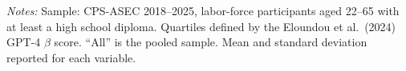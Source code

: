 \documentclass[11pt]{article}
\begin{document}
\begin{landscape}
\begin{table}[H]
\begin{center}
\caption{Summary statistics by AI exposure quartile.}
\label{tab:summary}

\end{center}
\smallskip
\noindent\footnotesize\textit{Notes:} Sample: CPS-ASEC 2018--2025, labor-force participants aged 22--65 with at least a high school diploma. Quartiles defined by the Eloundou et al.\ (2024) GPT-4 $\beta$ score. ``All'' is the pooled sample. Mean and standard deviation reported for each variable.
\end{table}
\end{landscape}
\end{document}
